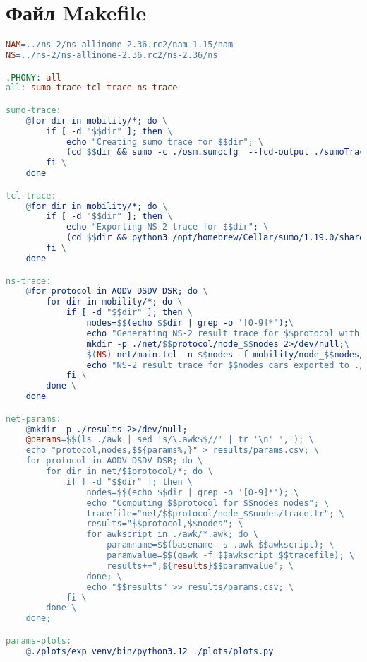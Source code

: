 \chapter{Файл Makefile}

\hypertarget{ap_makefile}{}

\begin{lstlisting}[language=make, style=mystyle, caption=Файл для автоматизации запуска эксперимента Makefile]
NAM=../ns-2/ns-allinone-2.36.rc2/nam-1.15/nam
NS=../ns-2/ns-allinone-2.36.rc2/ns-2.36/ns

.PHONY: all
all: sumo-trace tcl-trace ns-trace

sumo-trace:
	@for dir in mobility/*; do \
		if [ -d "$$dir" ]; then \
			echo "Creating sumo trace for $$dir"; \
			(cd $$dir && sumo -c ./osm.sumocfg  --fcd-output ./sumoTrace.xml > /dev/null 2>/dev/null); \
		fi \
	done

tcl-trace:
	@for dir in mobility/*; do \
		if [ -d "$$dir" ]; then \
			echo "Exporting NS-2 trace for $$dir"; \
			(cd $$dir && python3 /opt/homebrew/Cellar/sumo/1.19.0/share/sumo/tools/traceExporter.py --fcd-input sumoTrace.xml --ns2mobility-output mobility.tcl --shift 10); \
		fi \
	done

ns-trace:
	@for protocol in AODV DSDV DSR; do \
		for dir in mobility/*; do \
			if [ -d "$$dir" ]; then \
				nodes=$$(echo $$dir | grep -o '[0-9]*');\
				echo "Generating NS-2 result trace for $$protocol with $$nodes cars";\
				mkdir -p ./net/$$protocol/node_$$nodes 2>/dev/null;\
				$(NS) net/main.tcl -n $$nodes -f mobility/node_$$nodes/mobility.tcl -o ./net/$$protocol/node_$$nodes -rp $$protocol\
				echo "NS-2 result trace for $$nodes cars exported to ./net/$$protocol/node_$$nodes";\
			fi \
		done \
	done

net-params:
	@mkdir -p ./results 2>/dev/null;
	@params=$$(ls ./awk | sed 's/\.awk$$//' | tr '\n' ','); \
    echo "protocol,nodes,$${params%,}" > results/params.csv; \
	for protocol in AODV DSDV DSR; do \
		for dir in net/$$protocol/*; do \
			if [ -d "$$dir" ]; then \
				nodes=$$(echo $$dir | grep -o '[0-9]*'); \
                echo "Computing $$protocol for $$nodes nodes"; \
                tracefile="net/$$protocol/node_$$nodes/trace.tr"; \
                results="$$protocol,$$nodes"; \
                for awkscript in ./awk/*.awk; do \
                    paramname=$$(basename -s .awk $$awkscript); \
                    paramvalue=$$(gawk -f $$awkscript $$tracefile); \
                    results+=",${results}$$paramvalue"; \
                done; \
                echo "$$results" >> results/params.csv; \
			fi \
		done \
	done;

params-plots:
	@./plots/exp_venv/bin/python3.12 ./plots/plots.py
\end{lstlisting}
